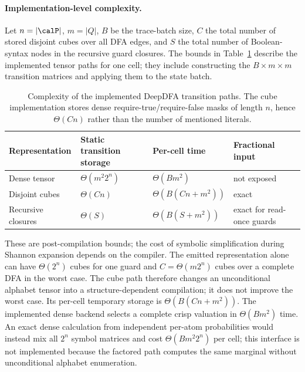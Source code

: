 \paragraph{Implementation-level complexity.}
Let $n=|\calP|$, $m=|Q|$, $B$ be the trace-batch size, $C$ the total number of stored disjoint cubes over all DFA edges, and $S$ the total number of Boolean-syntax nodes in the recursive guard closures. The bounds in Table~\ref{tab:deepdfa-complexity} describe the implemented tensor paths for one cell; they include constructing the $B\times m\times m$ transition matrices and applying them to the state batch.

\begin{table}[t]
  \centering
  \small
  \begin{tabular}{@{}llll@{}}
    \toprule
    Representation & Static transition storage & Per-cell time & Fractional input \\
    \midrule
    Dense tensor
      & $\Theta(m^2 2^n)$
      & $\Theta(Bm^2)$
      & not exposed \\
    Disjoint cubes
      & $\Theta(Cn)$
      & $\Theta\!\left(B(Cn+m^2)\right)$
      & exact \\
    Recursive closures
      & $\Theta(S)$
      & $\Theta\!\left(B(S+m^2)\right)$
      & exact for read-once guards \\
    \bottomrule
  \end{tabular}
  \caption{Complexity of the implemented DeepDFA transition paths. The cube implementation stores dense require-true/require-false masks of length $n$, hence $\Theta(Cn)$ rather than the number of mentioned literals.}
  \label{tab:deepdfa-complexity}
\end{table}

These are post-compilation bounds; the cost of symbolic simplification during Shannon expansion depends on the compiler. The emitted representation alone can have $\Theta(2^n)$ cubes for one guard and $C=\Theta(m2^n)$ cubes over a complete DFA in the worst case. The cube path therefore changes an unconditional alphabet tensor into a structure-dependent compilation; it does not improve the worst case. Its per-cell temporary storage is $\Theta(B(Cn+m^2))$. The implemented dense backend selects a complete crisp valuation in $\Theta(Bm^2)$ time. An exact dense calculation from independent per-atom probabilities would instead mix all $2^n$ symbol matrices and cost $\Theta(Bm^2 2^n)$ per cell; this interface is not implemented because the factored path computes the same marginal without unconditional alphabet enumeration.

